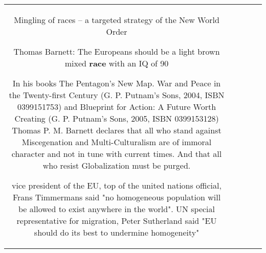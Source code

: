 \documentclass[11pt]{article}
\newlength\mylength
\begin{document}
\begin{center}
\begin{longtable}{|C{.65\mylength}|C{.30\mylength}|C{.12\mylength}|C{.12\mylength}|C{.12\mylength}|}
Mingling of races – a targeted strategy of the New World Order

Thomas Barnett: The Europeans should be a light brown mixed \textbf{race} with an IQ of 90 

In his books The Pentagon's New Map. War and Peace in the Twenty-first Century (G. P. Putnam's Sons, 2004, ISBN 0399151753) and Blueprint for Action: A Future Worth Creating (G. P. Putnam's Sons, 2005, ISBN 0399153128) Thomas P. M. Barnett declares that all who stand against Miscegenation and Multi-Culturalism are of immoral character and not in tune with current times. And that all who resist Globalization must be purged.

vice president of the EU, top of the united nations official, Frans Timmermans said "no homogeneous population will be allowed to exist anywhere in the world". UN special representative for migration, Peter Sutherland said "EU should do its best to undermine homogeneity" 






\end{longtable}
\end{center}
\end{document}
